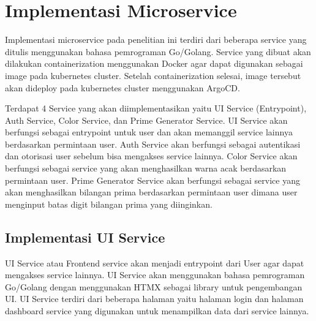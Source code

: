 \section{Implementasi Microservice}\label{sec:bab4_implementasi_microservice}
Implementasi microservice pada penelitian ini terdiri dari beberapa service
yang ditulis menggunakan bahasa pemrograman Go/Golang. Service yang dibuat akan
dilakukan containerization menggunakan Docker agar dapat digunakan sebagai
image pada kubernetes cluster. Setelah containerization selesai, image tersebut
akan dideploy pada kubernetes cluster menggunakan ArgoCD.

Terdapat 4 Service yang akan diimplementasikan yaitu UI Service (Entrypoint),
Auth Service, Color Service, dan Prime Generator Service. UI Service akan
berfungsi sebagai entrypoint untuk user dan akan memanggil service lainnya
berdasarkan permintaan user. Auth Service akan berfungsi sebagai autentikasi
dan otorisasi user sebelum bisa mengakses service lainnya. Color Service akan
berfungsi sebagai service yang akan menghasilkan warna acak berdasarkan
permintaan user. Prime Generator Service akan berfungsi sebagai service yang
akan menghasilkan bilangan prima berdasarkan permintaan user dimana user
menginput batas digit bilangan prima yang diinginkan.

\subsection{Implementasi UI Service}
UI Service atau Frontend service akan menjadi entrypoint dari User agar dapat
mengakses service lainnya. UI Service akan menggunakan bahasa pemrograman
Go/Golang dengan menggunakan HTMX sebagai library untuk pengembangan UI. UI
Service terdiri dari beberapa halaman yaitu halaman login dan halaman dashboard
service yang digunakan untuk menampilkan data dari service lainnya.

